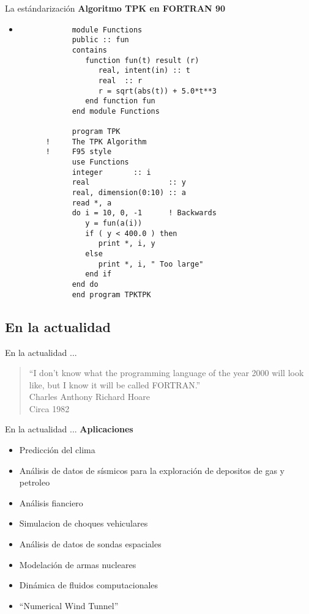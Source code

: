 \begin{frame}[fragile]{La estándarización}
    \textbf{Algoritmo TPK en FORTRAN 90}
    \begin{itemize}
    \item []  
     \begin{verbatim}
            module Functions  
            public :: fun
            contains
               function fun(t) result (r)
                  real, intent(in) :: t
                  real  :: r
                  r = sqrt(abs(t)) + 5.0*t**3
               end function fun
            end module Functions

            program TPK
      !     The TPK Algorithm
      !     F95 style
            use Functions
            integer       :: i
            real                  :: y
            real, dimension(0:10) :: a
            read *, a
            do i = 10, 0, -1      ! Backwards
               y = fun(a(i))
               if ( y < 400.0 ) then
                  print *, i, y
               else
                  print *, i, " Too large"
               end if
            end do
            end program TPKTPK
     \end{verbatim}
    \end{itemize}
\end{frame}


\subsection{En la actualidad}
\begin{frame}[fragile]{En la actualidad ...}
  \begin{quote}
    ``I don't know what the programming language of the year 2000 will look like, but I know it will be called FORTRAN.''\\
    Charles Anthony Richard Hoare\\
    Circa 1982
  \end{quote}
\end{frame}


\begin{frame}[fragile]{En la actualidad ...}
  \textbf{Aplicaciones}
  \begin{itemize}[<+(1)->]
    \item Predicción del clima
    \item Análisis de datos de sísmicos para la exploración de depositos de gas y petroleo
    \item Análisis fianciero
    \item Simulacion de choques vehiculares
    \item Análisis de datos de sondas espaciales
    \item Modelación de armas nucleares
    \item Dinámica de fluidos computacionales
    \item ``Numerical Wind Tunnel''
  \end{itemize}
\end{frame}



